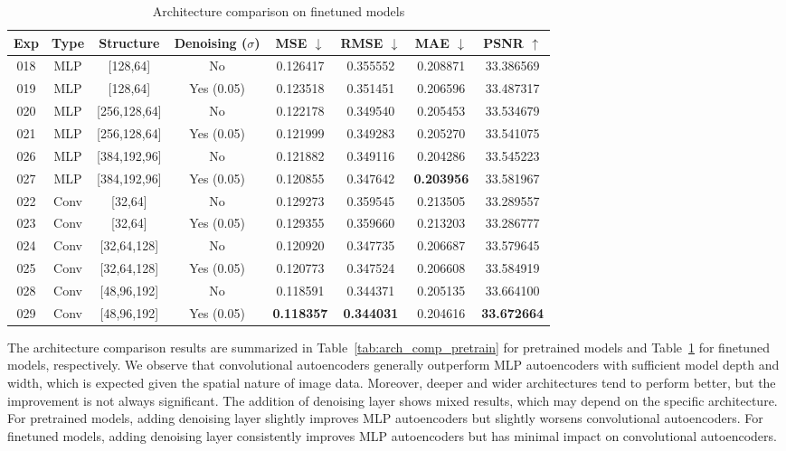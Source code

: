 \documentclass[10pt,letterpaper]{article}
\begin{document}
\begin{table}[t]
\centering
\caption{Architecture comparison on finetuned models}
\label{tab:arch_comp_finetune}
\scriptsize
\setlength{\tabcolsep}{4pt}
\begin{tabular}{c c c c c c c c}
\toprule
Exp & Type & Structure & Denoising ($\sigma$) & MSE $\downarrow$ & RMSE $\downarrow$ & MAE $\downarrow$ & PSNR $\uparrow$ \\
\midrule
018 & MLP  & [128,64]       & No         & 0.126417 & 0.355552 & 0.208871 & 33.386569 \\
019 & MLP  & [128,64]       & Yes (0.05) & 0.123518 & 0.351451 & 0.206596 & 33.487317 \\
020 & MLP  & [256,128,64]   & No         & 0.122178 & 0.349540 & 0.205453 & 33.534679 \\
021 & MLP  & [256,128,64]   & Yes (0.05) & 0.121999 & 0.349283 & 0.205270 & 33.541075 \\
026 & MLP  & [384,192,96]   & No         & 0.121882 & 0.349116 & 0.204286 & 33.545223 \\
027 & MLP  & [384,192,96]   & Yes (0.05) & 0.120855 & 0.347642 & \textbf{0.203956} & 33.581967 \\
\midrule
022 & Conv & [32,64]        & No         & 0.129273 & 0.359545 & 0.213505 & 33.289557 \\
023 & Conv & [32,64]        & Yes (0.05) & 0.129355 & 0.359660 & 0.213203 & 33.286777 \\
024 & Conv & [32,64,128]    & No         & 0.120920 & 0.347735 & 0.206687 & 33.579645 \\
025 & Conv & [32,64,128]    & Yes (0.05) & 0.120773 & 0.347524 & 0.206608 & 33.584919 \\
028 & Conv & [48,96,192]    & No         & 0.118591 & 0.344371 & 0.205135 & 33.664100 \\
029 & Conv & [48,96,192]    & Yes (0.05) & \textbf{0.118357} & \textbf{0.344031} & 0.204616 & \textbf{33.672664} \\
\bottomrule
\end{tabular}
\end{table}

The architecture comparison results are summarized in Table~\ref{tab:arch_comp_pretrain} for pretrained models and Table~\ref{tab:arch_comp_finetune} for finetuned models, respectively. We observe that convolutional autoencoders generally outperform MLP autoencoders with sufficient model depth and width, which is expected given the spatial nature of image data. Moreover, deeper and wider architectures tend to perform better, but the improvement is not always significant. The addition of denoising layer shows mixed results, which may depend on the specific architecture. For pretrained models, adding denoising layer slightly improves MLP autoencoders but slightly worsens convolutional autoencoders. For finetuned models, adding denoising layer consistently improves MLP autoencoders but has minimal impact on convolutional autoencoders.
\end{document}
